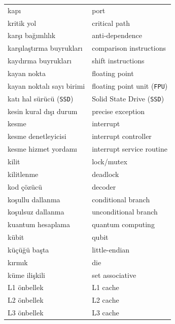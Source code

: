 {\begin{longtable}{@{}p{7.6cm}p{7.6cm}@{}}
kapı & port \\
kritik yol & critical path \\
karşı bağımlılık & anti-dependence \\
karşılaştırma buyrukları & comparison instructions \\
kaydırma buyrukları & shift instructions \\
kayan nokta & floating point \\
kayan noktalı sayı birimi & floating point unit (\texttt{FPU}) \\
katı hal sürücü (\texttt{SSD}) & Solid State Drive (\texttt{SSD}) \\
kesin kural dışı durum & precise exception \\
kesme & interrupt \\
kesme denetleyicisi & interrupt controller \\
kesme hizmet yordamı & interrupt service routine \\
kilit & lock/mutex \\
kilitlenme & deadlock \\
kod çözücü & decoder \\
koşullu dallanma & conditional branch \\
koşulsuz dallanma & unconditional branch \\
kuantum hesaplama & quantum computing \\
kübit & qubit \\
küçüğü başta & little-endian \\
kırmık & die \\
küme ilişkili & set associative \\

L1 önbellek & L1 cache \\
L2 önbellek & L2 cache \\
L3 önbellek & L3 cache \\


\end{longtable}}
